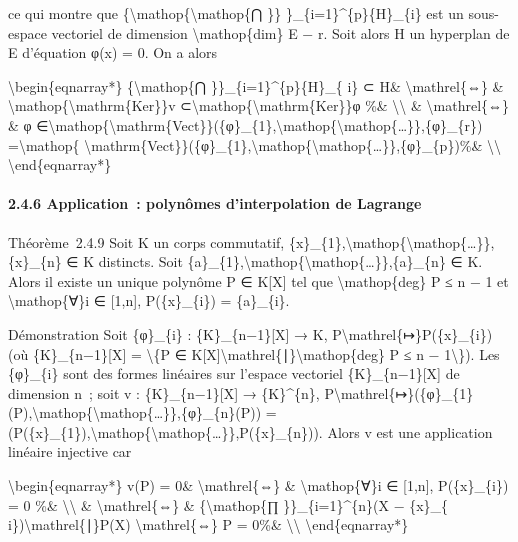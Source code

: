 \documentclass[]{article}
\begin{document}
ce qui montre que \{\textbackslash{}mathop\{\textbackslash{}mathop\{⋂
\}\} \}\_\{i=1\}\^{}\{p\}\{H\}\_\{i\} est un sous-espace vectoriel de
dimension \textbackslash{}mathop\{dim\} E − r. Soit alors H un hyperplan
de E d'équation φ(x) = 0. On a alors

\textbackslash{}begin\{eqnarray*\} \{\textbackslash{}mathop\{⋂
\}\}\_\{i=1\}\^{}\{p\}\{H\}\_\{ i\} ⊂ H\& \textbackslash{}mathrel\{⇔\}
\& \textbackslash{}mathop\{\textbackslash{}mathrm\{Ker\}\}v
⊂\textbackslash{}mathop\{\textbackslash{}mathrm\{Ker\}\}φ \%\&
\textbackslash{}\textbackslash{} \& \textbackslash{}mathrel\{⇔\} \& φ
∈\textbackslash{}mathop\{\textbackslash{}mathrm\{Vect\}\}(\{φ\}\_\{1\},\textbackslash{}mathop\{\textbackslash{}mathop\{\ldots{}\}\},\{φ\}\_\{r\})
=\textbackslash{}mathop\{
\textbackslash{}mathrm\{Vect\}\}(\{φ\}\_\{1\},\textbackslash{}mathop\{\textbackslash{}mathop\{\ldots{}\}\},\{φ\}\_\{p\})\%\&
\textbackslash{}\textbackslash{} \textbackslash{}end\{eqnarray*\}

\paragraph{2.4.6 Application~: polynômes d'interpolation de Lagrange}

Théorème~2.4.9 Soit K un corps commutatif,
\{x\}\_\{1\},\textbackslash{}mathop\{\textbackslash{}mathop\{\ldots{}\}\},\{x\}\_\{n\}
∈ K distincts. Soit
\{a\}\_\{1\},\textbackslash{}mathop\{\textbackslash{}mathop\{\ldots{}\}\},\{a\}\_\{n\}
∈ K. Alors il existe un unique polynôme P ∈ K{[}X{]} tel que
\textbackslash{}mathop\{deg\} P ≤ n − 1 et \textbackslash{}mathop\{∀\}i
∈ {[}1,n{]}, P(\{x\}\_\{i\}) = \{a\}\_\{i\}.

Démonstration Soit \{φ\}\_\{i\} : \{K\}\_\{n−1\}{[}X{]} → K,
P\textbackslash{}mathrel\{↦\}P(\{x\}\_\{i\}) (où \{K\}\_\{n−1\}{[}X{]} =
\textbackslash{}\{P ∈
K{[}X{]}\textbackslash{}mathrel\{∣\}\textbackslash{}mathop\{deg\} P ≤ n
− 1\textbackslash{}\}). Les \{φ\}\_\{i\} sont des formes linéaires sur
l'espace vectoriel \{K\}\_\{n−1\}{[}X{]} de dimension n~; soit v :
\{K\}\_\{n−1\}{[}X{]} → \{K\}\^{}\{n\},
P\textbackslash{}mathrel\{↦\}(\{φ\}\_\{1\}(P),\textbackslash{}mathop\{\textbackslash{}mathop\{\ldots{}\}\},\{φ\}\_\{n\}(P))
=
(P(\{x\}\_\{1\}),\textbackslash{}mathop\{\textbackslash{}mathop\{\ldots{}\}\},P(\{x\}\_\{n\})).
Alors v est une application linéaire injective car

\textbackslash{}begin\{eqnarray*\} v(P) = 0\&
\textbackslash{}mathrel\{⇔\} \& \textbackslash{}mathop\{∀\}i ∈
{[}1,n{]}, P(\{x\}\_\{i\}) = 0 \%\& \textbackslash{}\textbackslash{} \&
\textbackslash{}mathrel\{⇔\} \& \{\textbackslash{}mathop\{∏
\}\}\_\{i=1\}\^{}\{n\}(X − \{x\}\_\{
i\})\textbackslash{}mathrel\{∣\}P(X) \textbackslash{}mathrel\{⇔\} P =
0\%\& \textbackslash{}\textbackslash{} \textbackslash{}end\{eqnarray*\}
\end{document}
